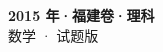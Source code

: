 \documentclass[zihao=-4, a4paper]{ctexart}
\begin{document}
\begin{center}
  {\Large\bfseries 2015 年·福建卷·理科}\\[4pt]
  {\large 数学 · 试题版}
\end{center}
\medskip
{}

\end{document}
